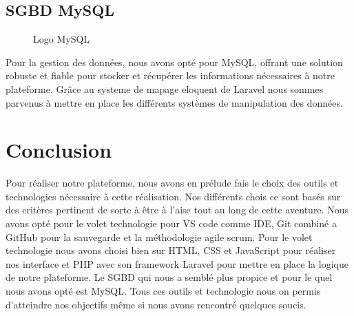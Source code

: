 \subsection{SGBD MySQL}
\begin{figure}[H]%
    \center%
    \setlength{\fboxsep}{5pt}%
    \setlength{\fboxrule}{0.5pt}%
    \caption{Logo MySQL}%
\end{figure}
Pour la gestion des données, nous avons opté pour MySQL, offrant une solution robuste et fiable pour stocker et récupérer les informations nécessaires à notre plateforme. Grâce au systeme de mapage eloquent de Laravel nous sommes parvenus à mettre en place  les différents systèmes de manipulation des données.

\section*{Conclusion}
Pour réaliser notre plateforme, nous avons en prélude fais le choix des outils et technologies nécessaire à cette réalisation. Nos différents chois ce sont basés sur des critères pertinent de sorte à être à l'aise tout au long de cette aventure. Nous avons opté pour le volet technologie pour VS code comme IDE, Git combiné a GitHub pour la sauvegarde et la méthodologie agile scrum. Pour le volet technologie nous avons choisi bien sur HTML, CSS et JavaScript pour réaliser nos interface et PHP avec son framework Laravel pour mettre en place la logique de notre plateforme. Le SGBD qui nous a semblé plus propice et pour le quel nous avons opté est MySQL. Tous ces outils et technologie nous on permis d'atteindre nos objectifs même si nous avons rencontré quelques soucis.